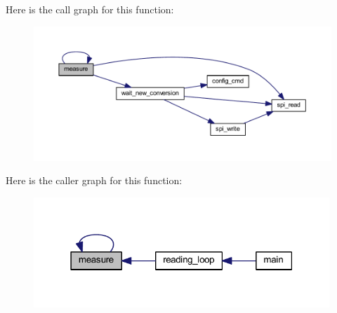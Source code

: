 Here is the call graph for this function\-:\nopagebreak
\begin{figure}[H]
\begin{center}
\leavevmode
\includegraphics[width=350pt]{d4/dee/a00008_gac914ebaa64afce03ee852af09659cf69_cgraph}
\end{center}
\end{figure}




Here is the caller graph for this function\-:\nopagebreak
\begin{figure}[H]
\begin{center}
\leavevmode
\includegraphics[width=316pt]{d4/dee/a00008_gac914ebaa64afce03ee852af09659cf69_icgraph}
\end{center}
\end{figure}


